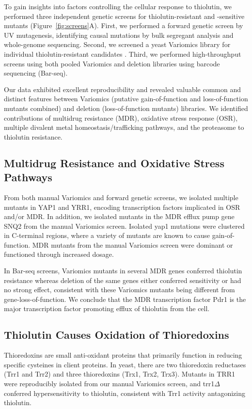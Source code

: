 \documentclass[11pt]{article}
\begin{document}
To gain insights into factors controlling the cellular response to thiolutin, we performed three independent genetic screens for thiolutin-resistant and -sensitive mutants (Figure~\ref{fig:screens}A). First, we performed a forward genetic screen by UV mutagenesis, identifying causal mutations by bulk segregant analysis and whole-genome sequencing. Second, we screened a yeast Variomics library for individual thiolutin-resistant candidates \citep{Pan2004}. Third, we performed high-throughput screens using both pooled Variomics and deletion libraries using barcode sequencing (Bar-seq).

Our data exhibited excellent reproducibility and revealed valuable common and distinct features between Variomics (putative gain-of-function and loss-of-function mutants combined) and deletion (loss-of-function mutants) libraries. We identified contributions of multidrug resistance (MDR), oxidative stress response (OSR), multiple divalent metal homeostasis/trafficking pathways, and the proteasome to thiolutin resistance.

\subsection{Multidrug Resistance and Oxidative Stress Pathways}

From both manual Variomics and forward genetic screens, we isolated multiple mutants in YAP1 and YRR1, encoding transcription factors implicated in OSR and/or MDR. In addition, we isolated mutants in the MDR efflux pump gene SNQ2 from the manual Variomics screen. Isolated yap1 mutations were clustered in C-terminal regions, where a variety of mutants are known to cause gain-of-function. MDR mutants from the manual Variomics screen were dominant or functioned through increased dosage.

In Bar-seq screens, Variomics mutants in several MDR genes conferred thiolutin resistance whereas deletion of the same genes either conferred sensitivity or had no strong effect, consistent with these Variomics mutants being different from gene-loss-of-function. We conclude that the MDR transcription factor Pdr1 is the major transcription factor promoting efflux of thiolutin from the cell.

\subsection{Thiolutin Causes Oxidation of Thioredoxins}

Thioredoxins are small anti-oxidant proteins that primarily function in reducing specific cysteines in client proteins. In yeast, there are two thioredoxin reductases (Trr1 and Trr2) and three thioredoxins (Trx1, Trx2, Trx3). Mutants in TRR1 were reproducibly isolated from our manual Variomics screen, and trr1$\Delta$ conferred hypersensitivity to thiolutin, consistent with Trr1 activity antagonizing thiolutin.
\end{document}
